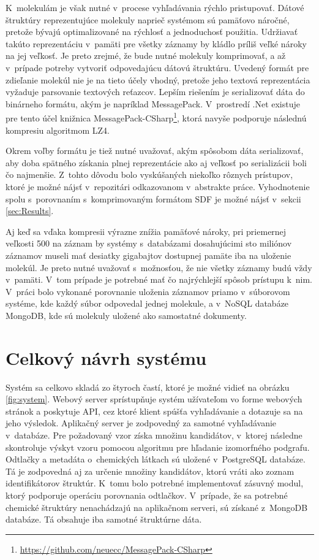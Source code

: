 \documentclass[slovak]{ExcelAtFIT} %
\begin{document}
K~molekulám je však nutné v~procese vyhľadávania rýchlo pristupovať. Dátové štruktúry reprezentujúce molekuly naprieč systémom sú pamäťovo náročné, pretože bývajú optimalizované na rýchlosť a jednoduchosť použitia. Udržiavať takúto reprezentáciu v~pamäti pre všetky záznamy by kládlo príliš veľké nároky na jej veľkosť. Je preto zrejmé, že bude nutné molekuly komprimovať, a až v~prípade potreby vytvoriť odpovedajúcu dátovú štruktúru. Uvedený formát pre zdieľanie molekúl nie je na tieto účely vhodný, pretože jeho textová reprezentácia vyžaduje parsovanie textových reťazcov. Lepším riešením je serializovať dáta do binárneho formátu, akým je napríklad MessagePack. V~prostredí .Net existuje pre tento účel knižnica MessagePack-CSharp\footnote{\url{https://github.com/neuecc/MessagePack-CSharp}}, ktorá navyše podporuje následnú kompresiu algoritmom LZ4. 

Okrem voľby formátu je tiež nutné uvažovať, akým spôsobom dáta serializovať, aby doba spätného zí\-ska\-nia plnej reprezentácie ako aj veľkosť po serializácii boli čo najmenšie. Z~tohto dôvodu bolo vyskúšaných niekoľko rôznych prístupov, ktoré je možné nájsť v~repozitári odkazovanom v~abstrakte práce. Vyhodnotenie spolu s~porovnaním s~komprimovaným formátom SDF je možné nájsť v~sekcii \ref{sec:Results}.

Aj keď sa vďaka kompresii výrazne znížia pamä\-ťové nároky, pri priemernej veľkosti \SI{500}{\byte} na záznam by systémy s~databázami dosahujúcimi sto miliónov zá\-zna\-mov museli mať desiatky gigabajtov dostupnej pamäte iba na uloženie molekúl. Je preto nutné u\-va\-žo\-vať s~možnosťou, že nie všetky záznamy budú vždy v~pamäti. V~tom prípade je potrebné mať čo najrýchlejší spôsob prístupu k~nim. V~práci bolo vykonané porovnanie uloženia záznamov priamo v~sú\-bo\-ro\-vom systéme, kde každý súbor odpovedal jednej molekule, a v~NoSQL databáze MongoDB, kde sú molekuly uložené ako samostatné dokumenty.

\section{Celkový návrh systému}
Systém sa celkovo skladá zo štyroch častí, ktoré je možné vidieť na obrázku \ref{fig:system}. Webový server sprístupňuje systém užívateľom vo forme webových stránok a poskytuje API, cez ktoré klient spúšťa vyhľadávanie a dotazuje sa na jeho výsledok. Aplikačný server je zodpovedný za samotné vyhľadávanie v~databáze. Pre požadovaný vzor získa množinu kandidátov, v~ktorej následne skontroluje výskyt vzoru pomocou algoritmu pre hľadanie izomorfného podgrafu. Odtlačky a metadáta o~chemických látkach sú uložené v~PostgreSQL databáze. Tá je zodpovedná aj za určenie množiny kandidátov, ktorú vráti ako zoznam identifikátorov štruktúr. K~tomu bolo potrebné implementovať zásuvný modul, ktorý podporuje operáciu porovnania odtlačkov. V~prípade, že sa potrebné chemické štruktúry nenachádzajú na aplikačnom serveri, sú získané z~MongoDB databáze. Tá obsahuje iba samotné štruktúrne dáta.
\end{document}

